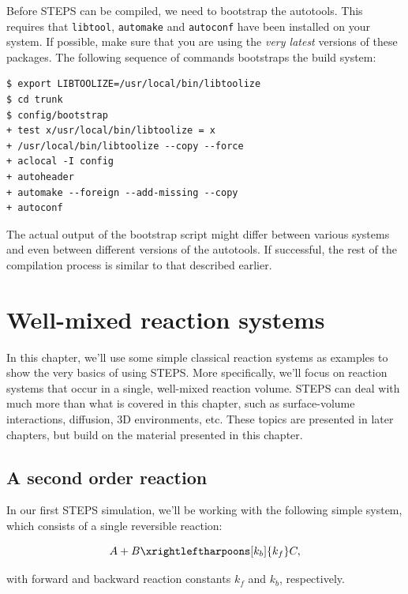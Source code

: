\documentclass[a4paper,12pt]{book}
\begin{document}
Before STEPS can be compiled, we need to bootstrap the autotools. This requires that \texttt{libtool}, \texttt{automake} and \texttt{autoconf} have been installed on your system. If possible, make sure that you are using the \emph{very latest} versions of these packages. The following sequence of commands bootstraps the build system:

\begin{verbatim}
$ export LIBTOOLIZE=/usr/local/bin/libtoolize
$ cd trunk
$ config/bootstrap
+ test x/usr/local/bin/libtoolize = x
+ /usr/local/bin/libtoolize --copy --force
+ aclocal -I config
+ autoheader
+ automake --foreign --add-missing --copy
+ autoconf
\end{verbatim}

The actual output of the bootstrap script might differ between various systems and even between different versions of the autotools. If successful, the rest of the compilation process is similar to that described earlier.

\chapter{Well-mixed reaction systems}\label{chap:wmkinetics}

In this chapter, we'll use some simple classical reaction systems as examples to show the very basics of using STEPS. More specifically, we'll focus on reaction systems that occur in a single, well-mixed reaction volume. STEPS can deal with much more than what is covered in this chapter, such as surface-volume interactions, diffusion, 3D environments, etc. These topics are presented in later chapters, but build on the material presented in this chapter.

\section{A second order reaction}

In our first STEPS simulation, we'll be working with the following simple system, which consists of a single reversible reaction:

\begin{equation}
\label{eqn:secondorderreaction}
A + B \xrightleftharpoons[k_b]{k_f} C,
\end{equation}

with forward and backward reaction constants $k_f$ and $k_b$, respectively.
\end{document}

